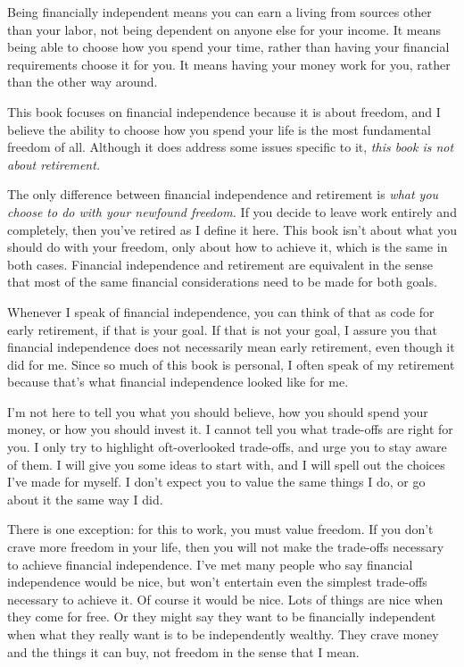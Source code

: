 Being financially independent means you can earn a living from sources other than your labor, not being dependent on anyone else for your income. It means being able to choose how you spend your time, rather than having your financial requirements choose it for you. It means having your money work for you, rather than the other way around.

This book focuses on financial independence because it is about freedom, and I believe the ability to choose how you spend your life is the most fundamental freedom of all. Although it does address some issues specific to it, \emph{this book is not about retirement.}

The only difference between financial independence and retirement is \emph{what you choose to do with your newfound freedom.} If you decide to leave work entirely and completely, then you've retired as I define it here. This book isn't about what you should do with your freedom, only about how to achieve it, which is the same in both cases. Financial independence and retirement are equivalent in the sense that most of the same financial considerations need to be made for both goals.

Whenever I speak of financial independence, you can think of that as code for early retirement, if that is your goal. If that is not your goal, I assure you that financial independence does not necessarily mean early retirement, even though it did for me. Since so much of this book is personal, I often speak of my retirement because that's what financial independence looked like for me.

I'm not here to tell you what you should believe, how you should spend your money, or how you should invest it. I cannot tell you what trade-offs are right for you. I only try to highlight oft-overlooked trade-offs, and urge you to stay aware of them. I will give you some ideas to start with, and I will spell out the choices I've made for myself. I don't expect you to value the same things I do, or go about it the same way I did.

There is one exception: for this to work, you must value freedom. If you don't crave more freedom in your life, then you will not make the trade-offs necessary to achieve financial independence. I've met many people who say financial independence would be nice, but won't entertain even the simplest trade-offs necessary to achieve it. Of course it would be nice. Lots of things are nice when they come for free. Or they might say they want to be financially independent when what they really want is to be independently wealthy. They crave money and the things it can buy, not freedom in the sense that I mean.

